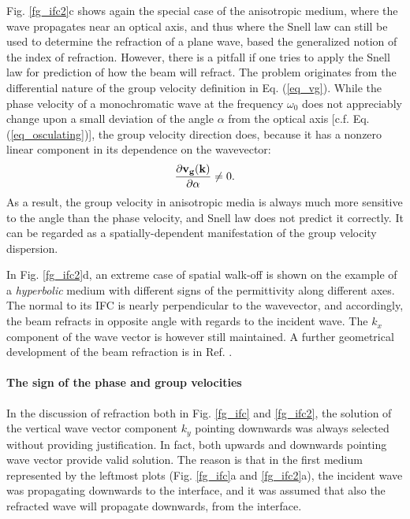 Fig. \ref{fg_ifc2}c shows again the special case of the anisotropic medium, where the wave propagates near an optical axis, and thus where the Snell law can still be used to determine the refraction of a plane wave, based the generalized notion of the index of refraction.
However, there is a pitfall if one tries to apply the Snell law for prediction of how the beam will refract. The problem originates from the differential nature of the group velocity definition in Eq. (\ref{eq_vg}). 
While the phase velocity of a monochromatic wave at the frequency $\omega_0$ does not appreciably change upon a small deviation of the angle $\alpha$ from the optical axis  [c.f.  Eq. (\ref{eq_osculating})], the group velocity direction does, because it has a nonzero linear component in its dependence on the wavevector:
$$ \frac{\partial {\mathbf{v_g}}({\mathbf{k}})}{\partial \alpha} \neq 0.$$
As a result, the group velocity in anisotropic media is always much more sensitive to the angle than the phase velocity, and Snell law does not predict it correctly. It can be regarded as a spatially-dependent manifestation of the group velocity dispersion.

In Fig. \ref{fg_ifc2}d, an extreme case of spatial walk-off is shown on the example of a \textit{hyperbolic} medium with different signs of the permittivity along different axes. %
 The normal to its IFC is nearly perpendicular to the wavevector, and accordingly, the beam refracts in opposite angle with regards to the incident wave. The $k_x$ component of the wave vector is however still maintained. A further geometrical development of the beam refraction is in Ref. \cite[p. 46]{klingshirn2007semiconductor}.


\paragraph{The sign of the phase and group velocities}  %
In the discussion of refraction both in Fig. \ref{fg_ifc} and \ref{fg_ifc2}, the solution of the vertical wave vector component $k_y$ pointing downwards was always selected without providing justification. In fact, both upwards and downwards pointing wave vector provide valid solution. The reason is that in the first medium represented by the leftmost plots (Fig. \ref{fg_ifc}a and \ref{fg_ifc2}a), the incident wave was propagating downwards to the interface, and it was assumed that also the refracted wave will propagate downwards, from the interface.

